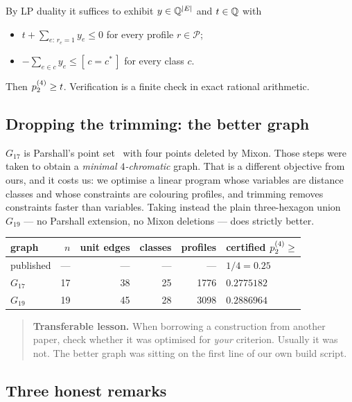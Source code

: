 By LP duality it suffices to exhibit $y\in\mathbb{Q}^{|E|}$ and $t\in\mathbb{Q}$ with
\begin{itemize}[leftmargin=1.6em]
\item[(C1)] $t+\sum_{e:\,r_e=1}y_e\le0$ for every profile $r\in\mathcal{P}$;
\item[(C2)] $-\sum_{e\in c}y_e\le[\,c=c^*\,]$ for every class $c$.
\end{itemize}
Then $p^{(4)}_{2}\ge t$. Verification is a finite check in exact rational
arithmetic.

\subsection{Dropping the trimming: the better graph}
\label{sec:trimming}

$G_{17}$ is Parshall's point set~\cite{Polymath16} with four points deleted by Mixon. Those steps
were taken to obtain a \emph{minimal $4$-chromatic} graph. That is a different
objective from ours, and it costs us: we optimise a linear program whose
variables are distance classes and whose constraints are colouring profiles, and
trimming removes constraints faster than variables. Taking instead the plain
three-hexagon union $G_{19}$ --- no Parshall extension, no Mixon deletions ---
does strictly better.

\begin{center}
\begin{tabular}{@{}lrrrrl@{}}
\toprule
graph & $n$ & unit edges & classes & profiles & certified $p^{(4)}_{2}\ge$ \\
\midrule
published & --- & --- & --- & --- & $1/4=0.25$ \\
$G_{17}$ & 17 & 38 & 25 & 1776 & $0.2775182$ \\
$G_{19}$ & 19 & 45 & 28 & 3098 & $\mathbf{0.2886964}$ \\
\bottomrule
\end{tabular}
\end{center}

\begin{quote}
\textbf{Transferable lesson.} When borrowing a construction from another paper,
check whether it was optimised for \emph{your} criterion. Usually it was not.
The better graph was sitting on the first line of our own build script.
\end{quote}

\subsection{Three honest remarks}

